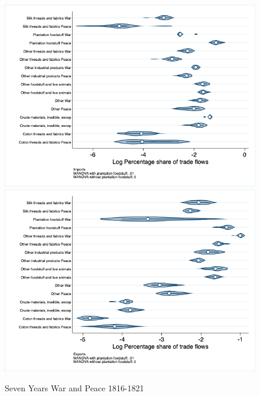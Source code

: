 \documentclass[12pt,a4paper,notitlepage,english]{article}
\begin{document}
\begin{figure}
\centering
\caption{Seven Years War and Peace 1816-1821}
\label{seven_peace1764_1777_nat_distr_aggr}
\includegraphics[scale=.4]{seven_peace1764_1777_nat_distr_Iaggr}
\includegraphics[scale=.4]{seven_peace1764_1777_nat_distr_Xaggr}
\end{figure}
\end{document}
